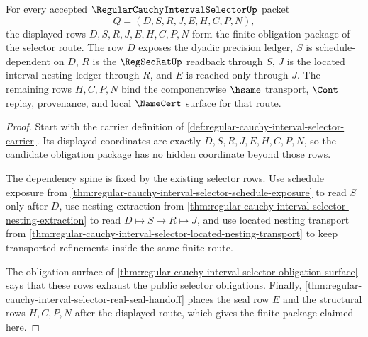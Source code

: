 \begin{theorem}
\label{thm:regular-cauchy-interval-selector-finite-route-obligation-package}
For every accepted $\RegularCauchyIntervalSelectorUp$ packet
$$
Q=(D,S,R,J,E,H,C,P,N),
$$
the displayed rows $D,S,R,J,E,H,C,P,N$ form the finite obligation package of the selector route. The row $D$ exposes the dyadic precision ledger, $S$ is schedule-dependent on $D$, $R$ is the $\RegSeqRatUp$ readback through $S$, $J$ is the located interval nesting ledger through $R$, and $E$ is reached only through $J$. The remaining rows $H,C,P,N$ bind the componentwise $\hsame$ transport, $\Cont$ replay, provenance, and local $\NameCert$ surface for that route.
\end{theorem}
\begin{proof}
Start with the carrier definition of \autoref{def:regular-cauchy-interval-selector-carrier}. Its displayed coordinates are exactly $D,S,R,J,E,H,C,P,N$, so the candidate obligation package has no hidden coordinate beyond those rows.

The dependency spine is fixed by the existing selector rows. Use schedule exposure from \autoref{thm:regular-cauchy-interval-selector-schedule-exposure} to read $S$ only after $D$, use nesting extraction from \autoref{thm:regular-cauchy-interval-selector-nesting-extraction} to read $D \mapsto S \mapsto R \mapsto J$, and use located nesting transport from \autoref{thm:regular-cauchy-interval-selector-located-nesting-transport} to keep transported refinements inside the same finite route.

The obligation surface of \autoref{thm:regular-cauchy-interval-selector-obligation-surface} says that these rows exhaust the public selector obligations. Finally, \autoref{thm:regular-cauchy-interval-selector-real-seal-handoff} places the seal row $E$ and the structural rows $H,C,P,N$ after the displayed route, which gives the finite package claimed here.
\end{proof}

